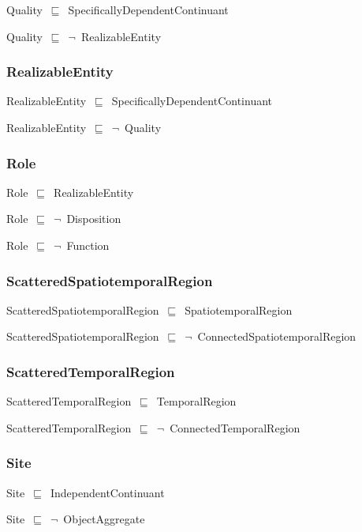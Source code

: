 \documentclass{article}
\begin{document}
Quality~\ensuremath{\sqsubseteq}~SpecificallyDependentContinuant~

Quality~\ensuremath{\sqsubseteq}~\ensuremath{\lnot}~RealizableEntity

\subsubsection*{RealizableEntity}

RealizableEntity~\ensuremath{\sqsubseteq}~SpecificallyDependentContinuant~

RealizableEntity~\ensuremath{\sqsubseteq}~\ensuremath{\lnot}~Quality

\subsubsection*{Role}

Role~\ensuremath{\sqsubseteq}~RealizableEntity~

Role~\ensuremath{\sqsubseteq}~\ensuremath{\lnot}~Disposition

Role~\ensuremath{\sqsubseteq}~\ensuremath{\lnot}~Function

\subsubsection*{ScatteredSpatiotemporalRegion}

ScatteredSpatiotemporalRegion~\ensuremath{\sqsubseteq}~SpatiotemporalRegion~

ScatteredSpatiotemporalRegion~\ensuremath{\sqsubseteq}~\ensuremath{\lnot}~ConnectedSpatiotemporalRegion

\subsubsection*{ScatteredTemporalRegion}

ScatteredTemporalRegion~\ensuremath{\sqsubseteq}~TemporalRegion~

ScatteredTemporalRegion~\ensuremath{\sqsubseteq}~\ensuremath{\lnot}~ConnectedTemporalRegion

\subsubsection*{Site}

Site~\ensuremath{\sqsubseteq}~IndependentContinuant~

Site~\ensuremath{\sqsubseteq}~\ensuremath{\lnot}~ObjectAggregate
\end{document}
